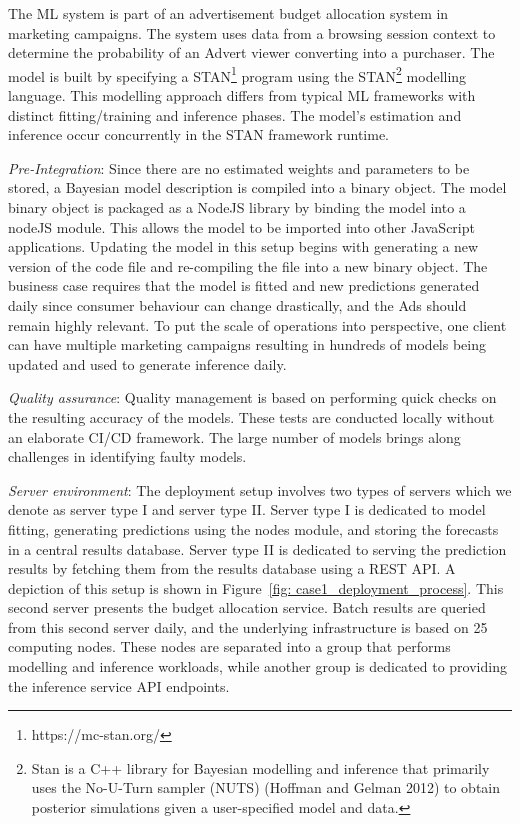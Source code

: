 
The ML system is part of an advertisement budget allocation system in marketing campaigns. The system uses data from a browsing session context to determine the probability of an Advert viewer converting into a purchaser. The model is built by specifying a STAN\footnote{https://mc-stan.org/} program using the STAN\footnote{Stan is a C++ library for Bayesian modelling and inference that primarily uses the No-U-Turn sampler (NUTS) (Hoffman and Gelman 2012) to obtain posterior simulations given a user-specified model and data.} modelling language. This modelling approach differs from typical ML frameworks with distinct fitting/training and inference phases. The model's estimation and inference occur concurrently in the STAN framework runtime.

\textit{Pre-Integration}: Since there are no estimated weights and parameters to be stored, a Bayesian model description is compiled into a binary object. The model binary object is packaged as a NodeJS library by binding the model into a nodeJS module. This allows the model to be imported into other JavaScript applications. Updating the model in this setup begins with generating a new version of the code file and re-compiling the file into a new binary object. The business case requires that the model is fitted and new predictions generated daily since consumer behaviour can change drastically, and the Ads should remain highly relevant. To put the scale of operations into perspective, one client can have multiple marketing campaigns resulting in hundreds of models being updated and used to generate inference daily.

\textit{Quality assurance}: Quality management is based on performing quick checks on the resulting accuracy of the models. These tests are conducted locally without an elaborate CI/CD framework. The large number of models brings along challenges in identifying faulty models.

\textit{Server environment}: The deployment setup involves two types of servers which we denote as server type I and server type II. Server type I is dedicated to model fitting, generating predictions using the nodes module, and storing the forecasts in a central results database. Server type II is dedicated to serving the prediction results by fetching them from the results database using a REST API. A depiction of this setup is shown in Figure~\ref{fig: case1_deployment_process}. This second server presents the budget allocation service. Batch results are queried from this second server daily, and the underlying infrastructure is based on 25 computing nodes. These nodes are separated into a group that performs modelling and inference workloads, while another group is dedicated to providing the inference service API endpoints.

